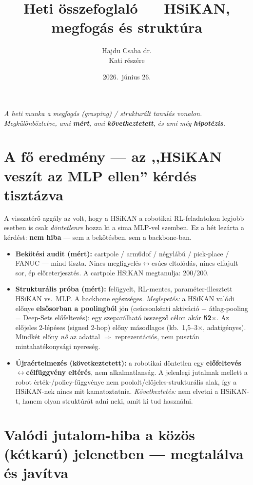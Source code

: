 \documentclass[11pt,a4paper]{article}
\title{\vspace{-1.2cm}\color{accent}\Large Heti összefoglaló --- HSiKAN, megfogás és struktúra}
\author{Hajdu Csaba dr. \\ \small Kati részére}
\date{2026.\ június 26.}
\begin{document}
\maketitle
\vspace{-0.6cm}

\noindent\textit{A heti munka a megfogás (grasping) / strukturált tanulás vonalon.
Megkülönböztetve, ami \textbf{mért}, ami \textbf{következtetett}, és ami még \textbf{hipotézis}.}

\section{A fő eredmény --- az ,,HSiKAN veszít az MLP ellen'' kérdés tisztázva}

A visszatérő aggály az volt, hogy a HSiKAN a robotikai RL-feladatokon legjobb esetben is csak
\emph{döntetlenre} hozza ki a sima MLP-vel szemben. Ez a hét lezárta a kérdést: \textbf{nem hiba}
--- sem a bekötésben, sem a backbone-ban.

\begin{itemize}
  \item \textbf{Bekötési audit (mért):} cartpole / arm6dof / négylábú / pick-place / FANUC --- mind
        tiszta. Nincs megfigyelés$\leftrightarrow$csúcs eltolódás, nincs elfajult sor, ép előreterjesztés.
        A cartpole HSiKAN megtanulja: 200/200.
  \item \textbf{Strukturális próba (mért):} felügyelt, RL-mentes, paraméter-illesztett HSiKAN vs.\ MLP.
        A backbone egészséges. \emph{Meglepetés:} a HSiKAN valódi előnye \textbf{elsősorban a poolingból}
        jön (csúcsonkénti aktiváció + átlag-pooling = Deep-Sets előfeltevés): egy szeparálható
        összegző célon akár \textbf{52$\times$}. Az előjeles 2-lépéses (signed 2-hop) előny másodlagos
        (kb.\ 1,5--3$\times$, adatigényes). Mindkét előny \emph{nő} az adattal $\Rightarrow$ reprezentációs,
        nem pusztán mintahatékonysági nyereség.
  \item \textbf{Újraértelmezés (következtetett):} a robotikai döntetlen egy
        \textbf{előfeltevés$\leftrightarrow$célfüggvény eltérés}, nem alkalmatlanság. A jelenlegi
        jutalmak mellett a robot érték-/policy-függvénye nem poololt/előjeles-strukturális alak, így a
        HSiKAN-nek nincs mit kamatoztatnia. \emph{Következtetés:} nem elvetni a HSiKAN-t, hanem olyan
        struktúrát adni neki, amit ki tud használni.
\end{itemize}

\section{Valódi jutalom-hiba a közös (kétkarú) jelenetben --- megtalálva és javítva}
\end{document}
